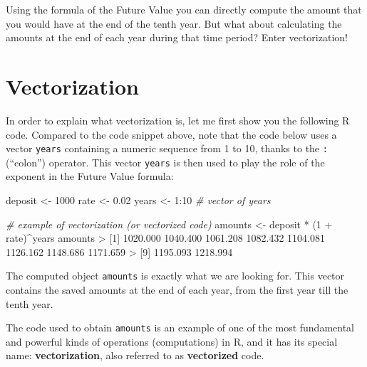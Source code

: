 \documentclass[
]{book}
\newenvironment{Shaded}{\begin{snugshade}}{\end{snugshade}}
\newcommand{\CommentTok}[1]{\textcolor[rgb]{0.56,0.35,0.01}{\textit{#1}}}
\newcommand{\DecValTok}[1]{\textcolor[rgb]{0.00,0.00,0.81}{#1}}
\newcommand{\FloatTok}[1]{\textcolor[rgb]{0.00,0.00,0.81}{#1}}
\newcommand{\NormalTok}[1]{#1}
\newcommand{\OtherTok}[1]{\textcolor[rgb]{0.56,0.35,0.01}{#1}}
\newcommand{\SpecialCharTok}[1]{\textcolor[rgb]{0.00,0.00,0.00}{#1}}
\begin{document}
Using the formula of the Future Value you can directly compute the amount
that you would have at the end of the tenth year. But what about calculating the
amounts at the end of each year during that time period? Enter vectorization!

\hypertarget{vectorization}{%
\section{Vectorization}\label{vectorization}}

In order to explain what vectorization is, let me first show you the following
R code. Compared to the code snippet above, note that the code below uses a
vector \texttt{years} containing a numeric sequence from 1 to 10, thanks to the \texttt{:}
(``colon'') operator. This vector \texttt{years} is then used to play the role of the
exponent in the Future Value formula:

\begin{Shaded}
\begin{Highlighting}[]
\NormalTok{deposit }\OtherTok{\textless{}{-}} \DecValTok{1000}
\NormalTok{rate }\OtherTok{\textless{}{-}} \FloatTok{0.02}
\NormalTok{years }\OtherTok{\textless{}{-}} \DecValTok{1}\SpecialCharTok{:}\DecValTok{10}  \CommentTok{\# vector of years}

\CommentTok{\# example of vectorization (or vectorized code)}
\NormalTok{amounts }\OtherTok{\textless{}{-}}\NormalTok{ deposit }\SpecialCharTok{*}\NormalTok{ (}\DecValTok{1} \SpecialCharTok{+}\NormalTok{ rate)}\SpecialCharTok{\^{}}\NormalTok{years}
\NormalTok{amounts}
\SpecialCharTok{\textgreater{}}\NormalTok{  [}\DecValTok{1}\NormalTok{] }\FloatTok{1020.000} \FloatTok{1040.400} \FloatTok{1061.208} \FloatTok{1082.432} \FloatTok{1104.081} \FloatTok{1126.162} \FloatTok{1148.686} \FloatTok{1171.659}
\SpecialCharTok{\textgreater{}}\NormalTok{  [}\DecValTok{9}\NormalTok{] }\FloatTok{1195.093} \FloatTok{1218.994}
\end{Highlighting}
\end{Shaded}

The computed object \texttt{amounts} is exactly what we are looking for. This vector
contains the saved amounts at the end of each year, from the first year till
the tenth year.

The code used to obtain \texttt{amounts} is an example of one of the most fundamental
and powerful kinds of operations (computations) in R, and it has its special
name: \textbf{vectorization}, also referred to as \textbf{vectorized} code.
\end{document}
